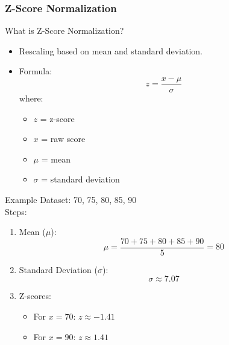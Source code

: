 \documentclass[aspectratio=169]{beamer}
\begin{document}
\begin{frame}[fragile]
    \frametitle{Z-Score Normalization}
    \begin{block}{What is Z-Score Normalization?}
        \begin{itemize}
            \item Rescaling based on mean and standard deviation.
            \item Formula: 
            \begin{equation}
                z = \frac{x - \mu}{\sigma}
            \end{equation}
            where:
            \begin{itemize}
                \item \(z\) = z-score
                \item \(x\) = raw score
                \item \(\mu\) = mean
                \item \(\sigma\) = standard deviation
            \end{itemize}
        \end{itemize}
    \end{block}
    
    \begin{block}{Example}
        Dataset: 70, 75, 80, 85, 90 \\
        Steps:
        \begin{enumerate}
            \item Mean (\(\mu\)): 
            \begin{equation}
                \mu = \frac{70 + 75 + 80 + 85 + 90}{5} = 80
            \end{equation}
            \item Standard Deviation (\(\sigma\)):
            \begin{equation}
                \sigma \approx 7.07
            \end{equation}
            \item Z-scores:
            \begin{itemize}
                \item For \(x = 70\): \(z \approx -1.41\)
                \item For \(x = 90\): \(z \approx 1.41\)
            \end{itemize}
        \end{enumerate}
    \end{block}
\end{frame}
\end{document}
